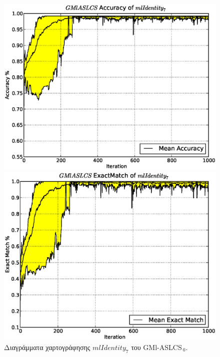 \begin{figure}[ht]
  \caption{Διαγράμματα χαρτογράφησης $mlIdentity_{7}$ του GMl-ASLCS$_{\:0}$.}
  \label{fig:gmlaslcs0Identity7}
  \centering
  \includegraphics[scale=.49]{./images/artificial/gmlaslcs0/base/mlIdentity7GMlASLCSacc.eps}
  
  
  \centering
  \includegraphics[scale=.49]{./images/artificial/gmlaslcs0/base/mlIdentity7GMlASLCSex.eps}


\end{figure}
